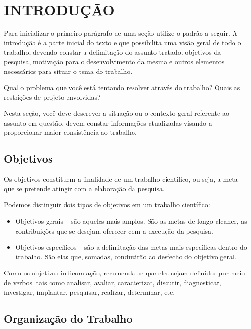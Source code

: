 \chapter{INTRODUÇÃO}
\label{sec:introdução}

Para inicializar o primeiro parágrafo de uma seção utilize o padrão a seguir. A introdução é a parte inicial do texto e que possibilita uma visão geral de todo o trabalho, devendo constar a delimitação do assunto tratado, objetivos da pesquisa, motivação para o desenvolvimento da mesma e outros elementos necessários para situar o tema do trabalho.

    Qual o problema que você está tentando resolver através do trabalho? Quais as restrições de projeto envolvidas?

    Nesta seção, você deve descrever a situação ou o contexto geral referente ao assunto em questão, devem constar informações atualizadas visando a proporcionar maior consistência ao trabalho.

\section{Objetivos}

    Os objetivos constituem a finalidade de um trabalho científico, ou seja, a meta que se pretende atingir com a elaboração da pesquisa.
    
    Podemos distinguir dois tipos de objetivos em um trabalho científico:
    
    \begin{itemize}
        \item Objetivos gerais – são aqueles mais amplos. São as metas de longo alcance, as contribuições que se desejam oferecer com a execução da pesquisa.

        \item Objetivos específicos – são a delimitação das metas mais específicas dentro do trabalho. São elas que, somadas, conduzirão ao desfecho do objetivo geral.
        
    \end{itemize}
    
    Como os objetivos indicam ação, recomenda-se que eles sejam definidos por meio de verbos, tais como analisar, avaliar, caracterizar, discutir, diagnosticar, investigar, implantar, pesquisar, realizar, determinar, etc.
    
\section{Organização do Trabalho}

